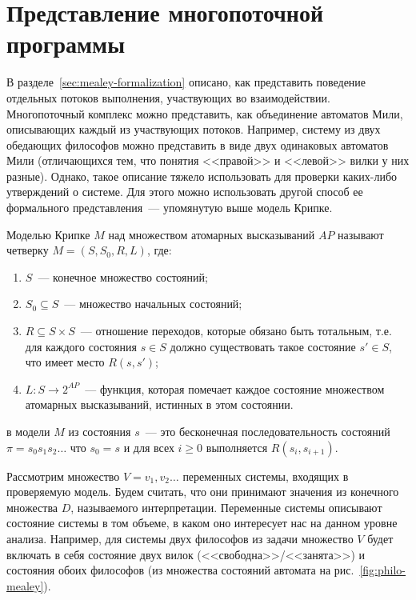 \section{Представление многопоточной программы}
\label{sec:kripke-formalization}

В разделе~\ref{sec:mealey-formalization} описано, как представить поведение отдельных
потоков выполнения, участвующих во взаимодействии. Многопоточный комплекс можно
представить, как объединение автоматов Мили, описывающих каждый из участвующих
потоков. Например, систему из двух обедающих философов можно представить в виде двух
одинаковых автоматов Мили (отличающихся тем, что понятия <<правой>> и <<левой>> вилки у
них разные). Однако, такое описание тяжело использовать для проверки каких-либо
утверждений о системе. Для этого можно использовать другой способ ее формального
представления~--- упомянутую выше модель Крипке.

Моделью Крипке $M$ над множеством атомарных высказываний $AP$ называют четверку $M=(S,
S_0, R, L)$, где:
\begin{enumerate}
\item $S$~--- конечное множество состояний;
\item $S_0 \subseteq S$~--- множество начальных состояний;
\item $R \subseteq S \times S$~--- отношение переходов, которые обязано быть тотальным,
  т.е. для каждого состояния $s \in S$ должно существовать такое состояние $s' \in S$, что
  имеет место $R(s, s')$;
\item $L: S \rightarrow 2^{AP}$~--- функция, которая помечает каждое состояние множеством
  атомарных высказываний, истинных в этом состоянии.
\end{enumerate}

 в модели $M$ из состояния $s$~--- это бесконечная последовательность состояний
$\pi = s_0s_1s_2 \ldots$ что $s_0 = s$ и для всех $i \geq 0$ выполняется $R(s_i,
s_{i+1})$.

Рассмотрим множество $V = {v_1, v_2 \ldots}$ переменных системы, входящих в проверяемую
модель. Будем считать, что они принимают значения из конечного множества $D$, называемого
 интерпретации. Переменные системы описывают состояние системы в том объеме,
в каком оно интересует нас на данном уровне анализа. Например, для системы двух философов
из задачи множество $V$ будет включать в себя состояние двух вилок
(<<свободна>>/<<занята>>) и состояния обоих философов (из множества состояний автомата на
рис.~\ref{fig:philo-mealey}).

